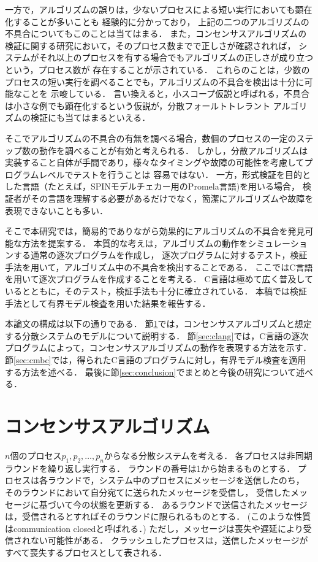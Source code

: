 \documentclass[technicalreport]{ieicej}
\theoremstyle{plain}
\begin{document}
一方で，アルゴリズムの誤りは，少ないプロセスによる短い実行においても顕在化することが多いことも
経験的に分かっており，
上記の二つのアルゴリズムの不具合についてもこのことは当てはまる．
また，コンセンサスアルゴリズムの検証に関する研究において，そのプロセス数までで正しさが確認されれば，
システムがそれ以上のプロセスを有する場合でもアルゴリズムの正しさが成り立つという，プロセス数が
存在することが示されている\cite{MaricSB17}．
これらのことは，少数のプロセスの短い実行を調べることでも，アルゴリズムの不具合を検出は十分に可能なことを
示唆している．
言い換えると，小スコープ仮説と呼ばれる，不具合は小さな例でも顕在化するという仮説が，分散フォールトトレラント
アルゴリズムの検証にも当てはまるといえる．

そこでアルゴリズムの不具合の有無を調べる場合，数個のプロセスの一定のステップ数の動作を調べることが有効と考えられる．
しかし，分散アルゴリズムは実装すること自体が手間であり，様々なタイミングや故障の可能性を考慮してプログラムレベルでテストを行うことは
容易ではない．
一方，形式検証を目的とした言語（たとえば，SPINモデルチェカー用のPromela言語\cite{spinbook})を用いる場合，
検証者がその言語を理解する必要があるだけでなく，簡潔にアルゴリズムや故障を表現できないことも多い．

そこで本研究では，簡易的でありながら効果的にアルゴリズムの不具合を発見可能な方法を提案する．
本質的な考えは，アルゴリズムの動作をシミュレーションする通常の逐次プログラムを作成し，
逐次プログラムに対するテスト，検証手法を用いて，アルゴリズム中の不具合を検出することである．
ここではC言語を用いて逐次プログラムを作成することを考える．
C言語は極めて広く普及しているとともに，そのテスト，検証手法も十分に確立されている．
本稿では検証手法として有界モデル検査を用いた結果を報告する．


本論文の構成は以下の通りである．
節\ref{sec:consensus}では，コンセンサスアルゴリズムと想定する分散システムのモデルについて説明する．
節\ref{sec:clang}では，C言語の逐次プログラムによって，コンセンサスアルゴリズムの動作を表現する方法を示す．
節\ref{sec:cmbc}では，得られたC言語のプログラムに対し，有界モデル検査を適用する方法を述べる．
最後に節\ref{sec:conclusion}でまとめと今後の研究について述べる．

\section{コンセンサスアルゴリズム}\label{sec:consensus}

$n$個のプロセス$p_1, p_2, \ldots, p_n$からなる分散システムを考える．
各プロセスは非同期ラウンドを繰り返し実行する．
ラウンドの番号は1から始まるものとする．
プロセスは各ラウンドで，システム中のプロセスにメッセージを送信したのち，
そのラウンドにおいて自分宛てに送られたメッセージを受信し，
受信したメッセージに基づいて今の状態を更新する．
あるラウンドで送信されたメッセージは，受信されるとすればそのラウンドに限られるものとする．
(このような性質はcommunication closedと呼ばれる\cite{DamianDMW19}．)
ただし，メッセージは喪失や遅延により受信されない可能性がある．
クラッシュしたプロセスは，送信したメッセージがすべて喪失するプロセスとして表される．
\end{document}
